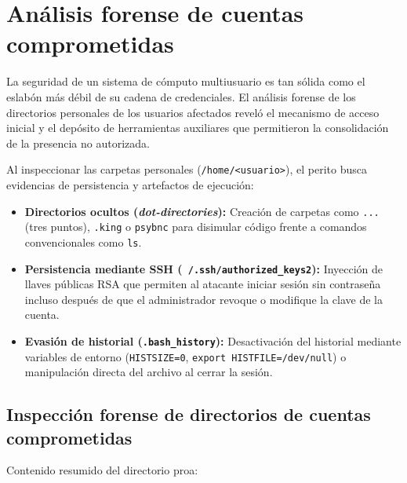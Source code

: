 \chapter{Análisis forense de cuentas comprometidas}
\label{cap:cuentas_comprometidas}

La seguridad de un sistema de cómputo multiusuario es tan sólida como el eslabón más débil de su cadena de credenciales. El análisis forense de los directorios personales de los usuarios afectados reveló el mecanismo de acceso inicial y el depósito de herramientas auxiliares que permitieron la consolidación de la presencia no autorizada.

\begin{notaforense}
Al inspeccionar las carpetas personales (\texttt{/home/<usuario>}), el perito busca evidencias de persistencia y artefactos de ejecución:
\begin{itemize}
    \item \textbf{Directorios ocultos (\textit{dot-directories}):} Creación de carpetas como \texttt{...} (tres puntos), \texttt{.king} o \texttt{psybnc} para disimular código frente a comandos convencionales como \texttt{ls}.
    \item \textbf{Persistencia mediante SSH (\texttt{~/.ssh/authorized\_keys2}):} Inyección de llaves públicas RSA que permiten al atacante iniciar sesión sin contraseña incluso después de que el administrador revoque o modifique la clave de la cuenta.
    \item \textbf{Evasión de historial (\texttt{.bash\_history}):} Desactivación del historial mediante variables de entorno (\texttt{HISTSIZE=0}, \texttt{export HISTFILE=/dev/null}) o manipulación directa del archivo al cerrar la sesión.
\end{itemize}
\end{notaforense}

\section{Inspección forense de directorios de cuentas comprometidas}

 Contenido resumido del directorio proa:

\vspace{1em}

